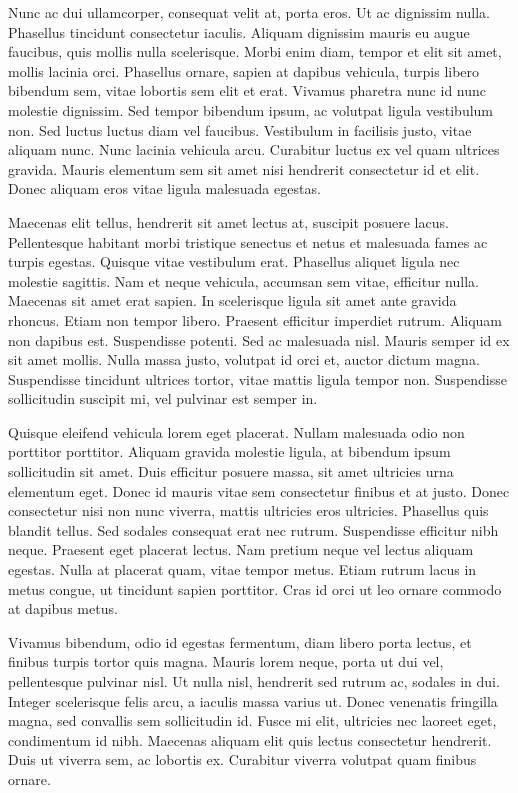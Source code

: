 \documentclass[sigconf]{acmart}
\begin{document}
Nunc ac dui ullamcorper, consequat velit at, porta eros. Ut ac dignissim nulla. Phasellus tincidunt consectetur iaculis. Aliquam dignissim mauris eu augue faucibus, quis mollis nulla scelerisque. Morbi enim diam, tempor et elit sit amet, mollis lacinia orci. Phasellus ornare, sapien at dapibus vehicula, turpis libero bibendum sem, vitae lobortis sem elit et erat. Vivamus pharetra nunc id nunc molestie dignissim. Sed tempor bibendum ipsum, ac volutpat ligula vestibulum non. Sed luctus luctus diam vel faucibus. Vestibulum in facilisis justo, vitae aliquam nunc. Nunc lacinia vehicula arcu. Curabitur luctus ex vel quam ultrices gravida. Mauris elementum sem sit amet nisi hendrerit consectetur id et elit. Donec aliquam eros vitae ligula malesuada egestas.

Maecenas elit tellus, hendrerit sit amet lectus at, suscipit posuere lacus. Pellentesque habitant morbi tristique senectus et netus et malesuada fames ac turpis egestas. Quisque vitae vestibulum erat. Phasellus aliquet ligula nec molestie sagittis. Nam et neque vehicula, accumsan sem vitae, efficitur nulla. Maecenas sit amet erat sapien. In scelerisque ligula sit amet ante gravida rhoncus. Etiam non tempor libero. Praesent efficitur imperdiet rutrum. Aliquam non dapibus est. Suspendisse potenti. Sed ac malesuada nisl. Mauris semper id ex sit amet mollis. Nulla massa justo, volutpat id orci et, auctor dictum magna. Suspendisse tincidunt ultrices tortor, vitae mattis ligula tempor non. Suspendisse sollicitudin suscipit mi, vel pulvinar est semper in.

Quisque eleifend vehicula lorem eget placerat. Nullam malesuada odio non porttitor porttitor. Aliquam gravida molestie ligula, at bibendum ipsum sollicitudin sit amet. Duis efficitur posuere massa, sit amet ultricies urna elementum eget. Donec id mauris vitae sem consectetur finibus et at justo. Donec consectetur nisi non nunc viverra, mattis ultricies eros ultricies. Phasellus quis blandit tellus. Sed sodales consequat erat nec rutrum. Suspendisse efficitur nibh neque. Praesent eget placerat lectus. Nam pretium neque vel lectus aliquam egestas. Nulla at placerat quam, vitae tempor metus. Etiam rutrum lacus in metus congue, ut tincidunt sapien porttitor. Cras id orci ut leo ornare commodo at dapibus metus.

Vivamus bibendum, odio id egestas fermentum, diam libero porta lectus, et finibus turpis tortor quis magna. Mauris lorem neque, porta ut dui vel, pellentesque pulvinar nisl. Ut nulla nisl, hendrerit sed rutrum ac, sodales in dui. Integer scelerisque felis arcu, a iaculis massa varius ut. Donec venenatis fringilla magna, sed convallis sem sollicitudin id. Fusce mi elit, ultricies nec laoreet eget, condimentum id nibh. Maecenas aliquam elit quis lectus consectetur hendrerit. Duis ut viverra sem, ac lobortis ex. Curabitur viverra volutpat quam finibus ornare.
\end{document}
